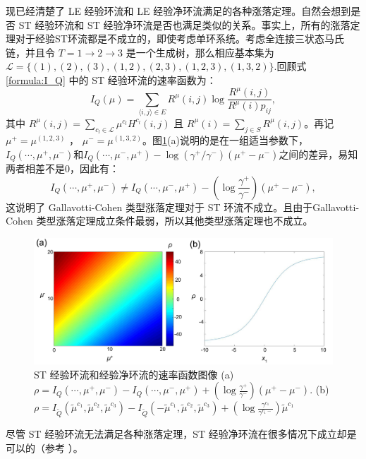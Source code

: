 现已经清楚了 LE 经验环流和 LE 经验净环流满足的各种涨落定理。自然会想到是否 ST 经验环流和 ST 经验净环流是否也满足类似的关系。事实上，所有的涨落定理对于经验ST环流都是不成立的，即使考虑单环系统。考虑全连接三状态马氏链，并且令 $T = 1\to 2\to 3$ 是一个生成树，那么相应基本集为$\mathcal{L} = \{(1),(2),(3),(1,2),(2,3),(1,2,3),(1,3,2)\}.$回顾式 \eqref{formula:I_Q} 中的 ST 经验环流的速率函数为：
\begin{equation*}
I_Q(\mu) = \sum_{\langle i,j\rangle\in E}R^{\mu}(i,j)\log\frac{R^{\mu}(i,j)}{R^{\mu}(i)p_{ij}},
\end{equation*}
其中 $R^{\mu}(i,j)=\sum_{c_l\in\mathcal{L}}\mu^{c_l}H^{c_l}(i,j)$ 且 $R^{\mu}(i)=\sum_{j\in S}R^{\mu}(i,j)$。再记 $\mu^+ = \mu^{(1,2,3)}$ ， $\mu^- = \mu^{(1,3,2)}$。图\ref{figure:ratefunction}(a)说明的是在一组适当参数下，$I_Q(\cdots,\mu^+,\mu^-)$和$I_Q(\cdots,\mu^-,\mu^+)-\log(\gamma^+ /\gamma^-) (\mu^+-\mu^-)$之间的差异，易知两者相差不是0，因此有：
\begin{equation*}
I_Q(\cdots,\mu^+,\mu^-)
\neq I_Q(\cdots,\mu^-,\mu^+)-\left(\log\frac{\gamma^+}{\gamma^-}\right)(\mu^+-\mu^-),
\end{equation*}
这说明了 Gallavotti-Cohen 类型涨落定理对于 ST 环流不成立。且由于Gallavotti-Cohen 类型涨落定理成立条件最弱，所以其他类型涨落定理也不成立。
\begin{figure}[h]
	\centering
	\includegraphics[scale=0.25]{chart/ratefunction.pdf}
	\caption{ST 经验环流和经验净环流的速率函数图像 (a) $\rho=I_Q(\cdots,\mu^+,\mu^-)-I_Q(\cdots,\mu^-,\mu^+)+(\log\frac{\gamma^+}{\gamma^-})(\mu^+-\mu^-)$. (b) $\rho=I_{\tilde{Q}}(\tilde{\mu}^{c_1},\tilde{\mu}^{c_2},\tilde{\mu}^{c_3})- I_{\tilde{Q}}(-\tilde{\mu}^{c_1},\tilde{\mu}^{c_2},\tilde{\mu}^{c_3})
		+(\log\frac{\gamma^{c_1}}{\gamma^{c_1-}})\tilde{\mu}^{c_1}$}\label{figure:ratefunction}
\end{figure}
尽管 ST 经验环流无法满足各种涨落定理，ST 经验净环流在很多情况下成立却是可以的（参考 \cite{andrieux2007fluctuation}）。

